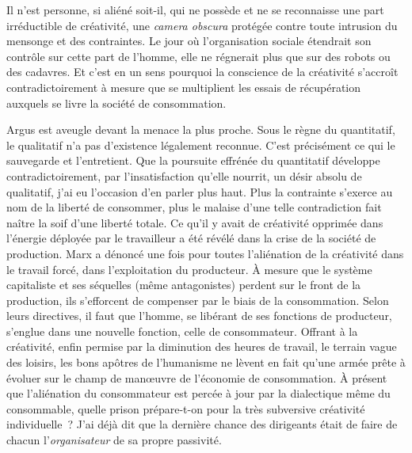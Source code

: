 \documentclass[french,twoside]{book} %
\begin{document}
Il n’est personne, si aliéné soit-il, qui ne possède et ne se reconnaisse une part irréductible de créativité, une \emph{camera obscura} protégée contre toute intrusion du mensonge et des contraintes. Le jour où l’organisation sociale étendrait son contrôle sur cette part de l’homme, elle ne régnerait plus que sur des robots ou des cadavres. Et c’est en un sens pourquoi la conscience de la créativité s’accroît contradictoirement à mesure que se multiplient les essais de récupération auxquels se livre la société de consommation.\par
Argus est aveugle devant la menace la plus proche. Sous le règne du quantitatif, le qualitatif n’a pas d’existence légalement reconnue. C’est précisément ce qui le sauvegarde et l’entretient. Que la poursuite effrénée du quantitatif développe contradictoirement, par l’insatisfaction qu’elle nourrit, un désir absolu de qualitatif, j’ai eu l’occasion d’en parler plus haut. Plus la contrainte s’exerce au nom de la liberté de consommer, plus le malaise d’une telle contradiction fait naître la soif d’une liberté totale. Ce qu’il y avait de créativité opprimée dans l’énergie déployée par le travailleur a été révélé dans la crise de la société de production. Marx a dénoncé une fois pour toutes l’aliénation de la créativité dans le travail forcé, dans l’exploitation du producteur. À mesure que le système capitaliste et ses séquelles (même antagonistes) perdent sur le front de la production, ils s’efforcent de compenser par le biais de la consommation. Selon leurs directives, il faut que l’homme, se libérant de ses fonctions de producteur, s’englue dans une nouvelle fonction, celle de consommateur. Offrant à la créativité, enfin permise par la diminution des heures de travail, le terrain vague des loisirs, les bons apôtres de l’humanisme ne lèvent en fait qu’une armée prête à évoluer sur le champ de manœuvre de l’économie de consommation. À présent que l’aliénation du consommateur est percée à jour par la dialectique même du consommable, quelle prison prépare-t-on pour la très subversive créativité individuelle ? J’ai déjà dit que la dernière chance des dirigeants était de faire de chacun l’\emph{organisateur} de sa propre passivité.\par
\end{document}
